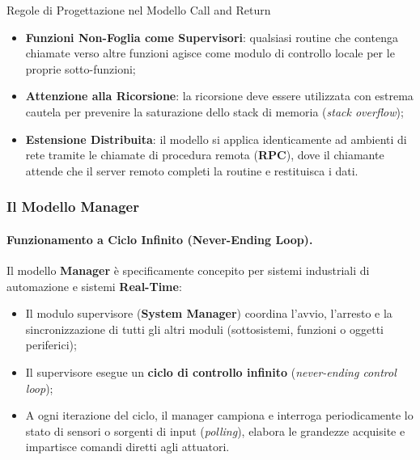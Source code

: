 \documentclass[12pt]{extarticle}
\begin{document}
\begin{cbox}{Regole di Progettazione nel Modello Call and Return}
\begin{itemize}
    \item \textbf{Funzioni Non-Foglia come Supervisori}: qualsiasi routine che contenga chiamate verso altre funzioni agisce come modulo di controllo locale per le proprie sotto-funzioni;
    \item \textbf{Attenzione alla Ricorsione}: la ricorsione deve essere utilizzata con estrema cautela per prevenire la saturazione dello stack di memoria (\textit{stack overflow});
    \item \textbf{Estensione Distribuita}: il modello si applica identicamente ad ambienti di rete tramite le chiamate di procedura remota (\textbf{RPC}), dove il chiamante attende che il server remoto completi la routine e restituisca i dati.
\end{itemize}
\end{cbox}

\subsubsection{Il Modello Manager}

\paragraph{Funzionamento a Ciclo Infinito (Never-Ending Loop).}
Il modello \textbf{Manager} è specificamente concepito per sistemi industriali di automazione e sistemi \textbf{Real-Time}:
\begin{itemize}
    \item Il modulo supervisore (\textbf{System Manager}) coordina l'avvio, l'arresto e la sincronizzazione di tutti gli altri moduli (sottosistemi, funzioni o oggetti periferici);
    \item Il supervisore esegue un \textbf{ciclo di controllo infinito} (\textit{never-ending control loop});
    \item A ogni iterazione del ciclo, il manager campiona e interroga periodicamente lo stato di sensori o sorgenti di input (\textit{polling}), elabora le grandezze acquisite e impartisce comandi diretti agli attuatori.
\end{itemize}
\end{document}
